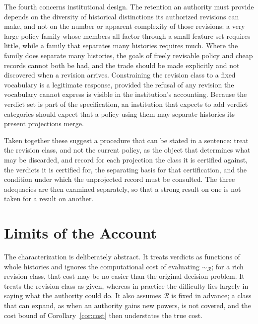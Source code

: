 \documentclass[11pt]{article}
\theoremstyle{remark}
\newcommand{\Rev}{\mathcal{R}}
\begin{document}
The fourth concerns institutional design. The retention an authority must provide depends on the diversity of historical distinctions its authorized revisions can make, and not on the number or apparent complexity of those revisions: a very large policy family whose members all factor through a small feature set requires little, while a family that separates many histories requires much. Where the family does separate many histories, the goals of freely revisable policy and cheap records cannot both be had, and the trade should be made explicitly and not discovered when a revision arrives. Constraining the revision class to a fixed vocabulary is a legitimate response, provided the refusal of any revision the vocabulary cannot express is visible in the institution's accounting. Because the verdict set is part of the specification, an institution that expects to add verdict categories should expect that a policy using them may separate histories its present projections merge.

Taken together these suggest a procedure that can be stated in a sentence: treat the revision class, and not the current policy, as the object that determines what may be discarded, and record for each projection the class it is certified against, the verdicts it is certified for, the separating basis for that certification, and the condition under which the unprojected record must be consulted. The three adequacies are then examined separately, so that a strong result on one is not taken for a result on another.

\section{Limits of the Account}

The characterization is deliberately abstract. It treats verdicts as functions of whole histories and ignores the computational cost of evaluating $\sim_{\Rev}$; for a rich revision class, that cost may be no easier than the original decision problem. It treats the revision class as given, whereas in practice the difficulty lies largely in saying what the authority could do. It also assumes $\Rev$ is fixed in advance; a class that can expand, as when an authority gains new powers, is not covered, and the cost bound of Corollary~\ref{cor:cost} then understates the true cost.
\end{document}
